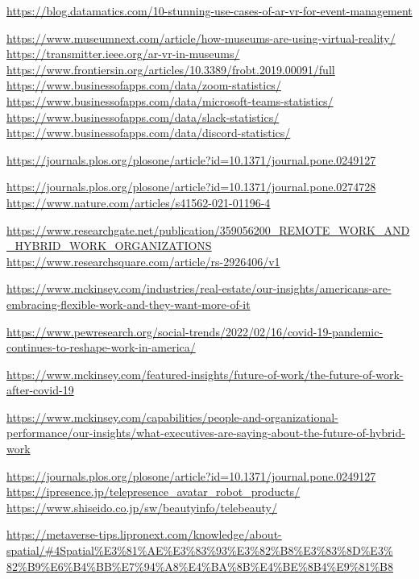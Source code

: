 \documentclass[12pt]{article}
\begin{document}
\begin{thebibliography}{99}

    \url{https://blog.datamatics.com/10-stunning-use-cases-of-ar-vr-for-event-management}

    \url{https://www.museumnext.com/article/how-museums-are-using-virtual-reality/}
    \url{https://transmitter.ieee.org/ar-vr-in-museums/}
    \url{https://www.frontiersin.org/articles/10.3389/frobt.2019.00091/full}
    \url{https://www.businessofapps.com/data/zoom-statistics/}
    \url{https://www.businessofapps.com/data/microsoft-teams-statistics/}
    \url{https://www.businessofapps.com/data/slack-statistics/}
    \url{https://www.businessofapps.com/data/discord-statistics/}

    \url{https://journals.plos.org/plosone/article?id=10.1371/journal.pone.0249127}

    \url{https://journals.plos.org/plosone/article?id=10.1371/journal.pone.0274728}
    \url{https://www.nature.com/articles/s41562-021-01196-4}

    \url{https://www.researchgate.net/publication/359056200_REMOTE_WORK_AND_HYBRID_WORK_ORGANIZATIONS}
    \url{https://www.researchsquare.com/article/rs-2926406/v1}

    \url{https://www.mckinsey.com/industries/real-estate/our-insights/americans-are-embracing-flexible-work-and-they-want-more-of-it}

    \url{https://www.pewresearch.org/social-trends/2022/02/16/covid-19-pandemic-continues-to-reshape-work-in-america/}

    \url{https://www.mckinsey.com/featured-insights/future-of-work/the-future-of-work-after-covid-19}

    \url{https://www.mckinsey.com/capabilities/people-and-organizational-performance/our-insights/what-executives-are-saying-about-the-future-of-hybrid-work}

    \url{https://journals.plos.org/plosone/article?id=10.1371/journal.pone.0249127}
    \url{https://ipresence.jp/telepresence_avatar_robot_products/}
    \url{https://www.shiseido.co.jp/sw/beautyinfo/telebeauty/}

    \url{https://metaverse-tips.lipronext.com/knowledge/about-spatial/#4Spatial%E3%81%AE%E3%83%93%E3%82%B8%E3%83%8D%E3% 82%B9%E6%B4%BB%E7%94%A8%E4%BA%8B%E4%BE%8B4%E9%81%B8}
\end{thebibliography}
\end{document}
